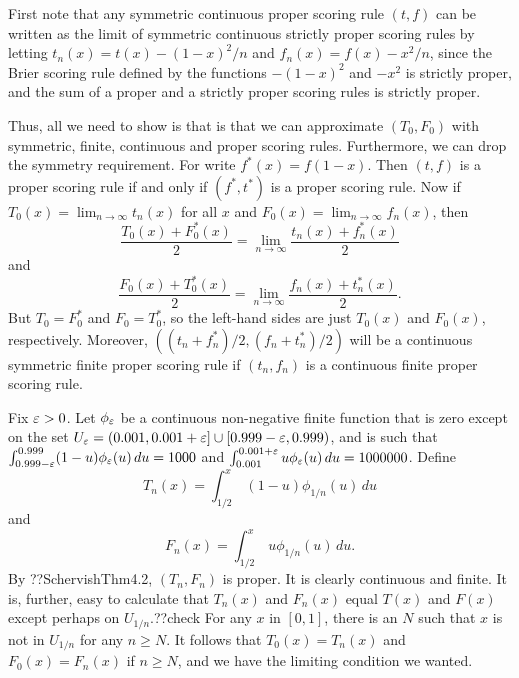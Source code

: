 First note that any symmetric continuous proper scoring rule $(t,f)$ can be written as the limit of symmetric continuous
strictly proper scoring rules by letting $t_n(x)=t(x)-(1-x)^2/n$ and $f_n(x)=f(x)-x^2/n$, since the Brier scoring rule defined
by the functions $-(1-x)^2$ and $-x^2$ is strictly proper, and the sum of a proper and a strictly proper scoring rules is
strictly proper. 

Thus, all we need to show is that is that we can approximate $(T_0,F_0)$ with symmetric, finite, continuous and proper scoring rules.
Furthermore, we can drop the symmetry requirement. For write $f^*(x)=f(1-x)$. Then $(t,f)$ is a proper scoring rule if and
only if $(f^*,t^*)$ is a proper scoring rule. Now if $T_0(x)=\lim_{n\to\infty} t_n(x)$ for all $x$ and $F_0(x)=\lim_{n\to\infty} f_n(x)$, then
$$
    \frac{T_0(x)+F_0^*(x)}2 = \lim_{n\to\infty} \frac{t_n(x)+f_n^*(x)}2
$$    
    and
$$    
    \frac{F_0(x)+T_0^*(x)}2 = \lim_{n\to\infty} \frac{f_n(x)+t_n^*(x)}2. 
$$    
But $T_0=F^*_0$ and $F_0=T_0^*$, so the left-hand sides are just $T_0(x)$ and $F_0(x)$, respectively. Moreover, $((t_n+f_n^*)/2,(f_n+t_n^*)/2)$  
will be a continuous symmetric finite proper scoring rule if $(t_n,f_n)$ is a continuous finite proper scoring rule.

Fix $\varepsilon>0$. Let $\phi_\varepsilon$ be a continuous non-negative finite function that is zero except on the set $U_\varepsilon=(0.001,0.001+\varepsilon]\cup [0.999-\varepsilon,0.999)$, 
and is such that $\int_{0.999-\varepsilon}^{0.999} (1-u) \phi_\varepsilon(u)\, du = 1000$ and $\int_{0.001}^{0.001+\varepsilon} u \phi_\varepsilon(u) \, du = 1000000$. 
Define 
$$
    T_n(x) = \int_{1/2}^x \, (1-u)\phi_{1/n}(u) \, du
$$
and 
$$
    F_n(x) = \int_{1/2}^x \, u \phi_{1/n}(u) \, du.
$$
By ??SchervishThm4.2, $(T_n,F_n)$ is proper. It is clearly continuous and finite. It is, further, easy to calculate that 
$T_n(x)$ and $F_n(x)$ equal $T(x)$ and $F(x)$ except perhaps on $U_{1/n}$.??check For any $x$ in $[0,1]$, there is an $N$
such that $x$ is not in $U_{1/n}$ for any $n\ge N$. It follows that $T_0(x)=T_n(x)$ and $F_0(x)=F_n(x)$ if $n\ge N$, and we have
the limiting condition we wanted.

\chaptertail 


